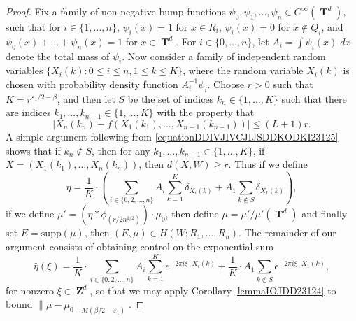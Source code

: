 \documentclass[dvipsnames,letterpaper,12pt]{article}
\numberwithin{equation}{section}
\DeclareMathOperator{\ZZ}{\mathbf{Z}}
\DeclareMathOperator{\TT}{\mathbf{T}}
\numberwithin{theorem}{section}
\begin{document}
\begin{proof}
    Fix a family of non-negative bump functions $\psi_0,\psi_1,\dots,\psi_n \in C^\infty(\TT^d)$, such that for $i \in \{ 1,\dots,n \}$, $\psi_i(x) = 1$ for $x \in R_i$, $\psi_i(x) = 0$ for $x \not \in Q_i$, and $\psi_0(x) + \dots + \psi_n(x) = 1$ for $x \in \TT^d$. For $i \in \{ 0, \dots, n \}$, let $A_i = \int \psi_i(x)\; dx$ denote the total mass of $\psi_i$. Now consider a family of independent random variables $\{ X_i(k) : 0 \leq i \leq n, 1 \leq k \leq K \}$, where the random variable $X_i(k)$ is chosen with probability density function $A_i^{-1} \psi_i$. Choose $r > 0$ such that $K = r^{\varepsilon_1/2-\beta}$,
    and then let $S$ be the set of indices $k_n \in \{ 1, \dots, K \}$ such that there are indices $k_1,\dots,k_{n-1} \in \{ 1,\dots,K \}$ with the property that
    \begin{equation} \label{equationDDIVJIVCJIJSDDKODKI23125}
        |X_n(k_n) - f(X_1(k_1),\dots,X_{n-1}(k_{n-1}))| \leq (L+1)r.
    \end{equation}
    A simple argument following from \eqref{equationDDIVJIVCJIJSDDKODKI23125} shows that if $k_n \not \in S$, then for any $k_1,\dots,k_{n-1} \in \{ 1, \dots, K \}$, if $X = (X_1(k_1),\dots,X_n(k_n))$, then $d(X,W) \geq r$. Thus if we define
    \[ \eta = \frac{1}{K} \cdot \left( \sum_{i \in \{ 0, 2, \dots, n \}} A_i \sum_{k = 1}^K \delta_{X_i(k)} + A_1 \sum_{k \not \in S} \delta_{X_1(k)} \right), \]
    if we define $\mu' = (\eta * \phi_{(r/2n^{1/2})}) \cdot \mu_0$, then define $\mu = \mu'/\mu'(\TT^d)$ and finally set $E = \text{supp}(\mu)$, then $(E,\mu) \in H(W;R_1,\dots,R_n)$. The remainder of our argument consists of obtaining control on the exponential sum
    \begin{equation} \label{equationIODJOIVJIO}
        \widehat{\eta}(\xi) = \frac{1}{K} \cdot \sum_{i \in \{ 0, 2, \dots, n \}} A_i \sum_{k = 1}^K e^{-2 \pi i \xi \cdot X_i(k)} + \frac{1}{K} \cdot A_1 \sum_{k \not \in S} e^{-2 \pi i \xi \cdot X_1(k)},
    \end{equation}
    for nonzero $\xi \in \ZZ^d$, so that we may apply Corollary \ref{lemmaIOJDD23124} to bound $\| \mu - \mu_0 \|_{M(\beta/2-\varepsilon_1)}$.


\end{proof}
\end{document}
